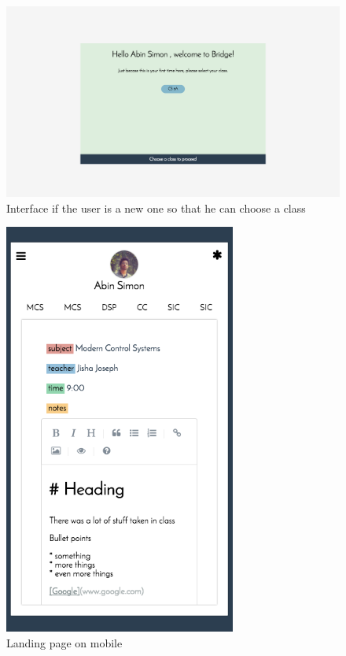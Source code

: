 \begin{figure}[htb]
    \centering
    \includegraphics[width=\linewidth]{newuserpopup.png}
    \caption{Interface if the user is a new one so that he can choose a class}
    \label{fig:newuserpopup} %
\end{figure}

\begin{figure}[htb]
    \centering
    \includegraphics[width=3in]{mobilelanding.png}
    \caption{Landing page on mobile}
    \label{fig:mobilelanding} %
\end{figure}

